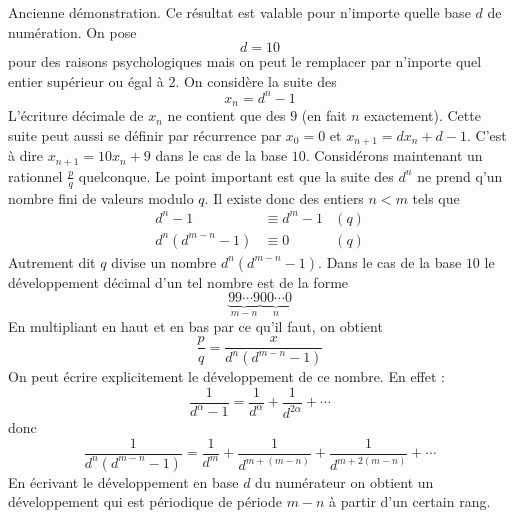 Ancienne démonstration.
Ce résultat est valable pour n'importe quelle base $d$ de numération. On pose 
\begin{displaymath}
 d =10
\end{displaymath}
pour des raisons psychologiques mais on peut le remplacer par n'inporte quel entier supérieur ou égal à 2. On considère la suite des
\begin{displaymath}
 x_n = d^n -1
\end{displaymath}
L'écriture décimale de $x_n$ ne contient que des $9$ (en fait $n$ exactement). Cette suite peut aussi se définir par récurrence par $x_0=0$ et $x_{n+1}=d x_n + d-1$. C'est à dire $x_{n+1}=10 x_n + 9$ dans le cas de la base $10$.\newline
Considérons maintenant un rationnel $\frac{p}{q}$ quelconque. \newline
Le point important est que la suite des $d^n$ ne prend q'un nombre fini de valeurs  modulo $q$.\newline
Il existe donc des entiers $n<m$ tels que
\begin{align*}
 d^n -1 &\equiv  d^m -1 &(q) \\
 d^{n}(d^{m-n} -1) &\equiv 0 &(q) 
\end{align*}
Autrement dit $q$ divise un nombre $d^{n}(d^{m-n} -1)$. Dans le cas de la base $10$ le développement décimal d'un tel nombre est de la forme
\begin{displaymath}
 \underbrace{99\cdots 9}_{m-n}\underbrace{00\cdots0}_n
\end{displaymath}
En multipliant en haut et en bas par ce qu'il faut, on obtient
\begin{displaymath}
 \dfrac{p}{q} = \dfrac{x}{d^{n}(d^{m-n} -1)}
\end{displaymath}
On peut écrire explicitement le développement de ce nombre. En effet :
\begin{displaymath}
 \dfrac{1}{d^\alpha -1}= \dfrac{1}{d^\alpha} + \dfrac{1}{d^{2\alpha}} + \cdots
\end{displaymath}
donc 
\begin{displaymath}
 \dfrac{1}{d^{n}(d^{m-n} -1)}= \dfrac{1}{d^m} + \dfrac{1}{d^{m+(m-n)}} + \dfrac{1}{d^{m+2(m-n)}}+ \cdots
\end{displaymath}
En écrivant le développement en base $d$ du numérateur on obtient un développement qui est périodique de période $m-n$ à partir d'un certain rang.


